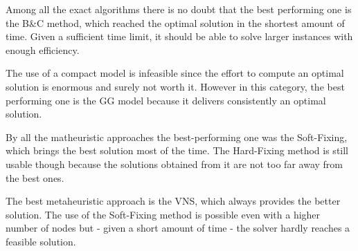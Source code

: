 Among all the exact algorithms there is no doubt that the best performing one is the B\&C method, which reached the optimal solution in the shortest amount of time. Given a sufficient time limit, it should be able to solve larger instances with enough efficiency.

The use of a compact model is infeasible since the effort to compute an optimal solution is enormous and surely not worth it. However in this category, the best performing one is the GG model because it delivers consistently an optimal solution.

By all the matheuristic approaches the best-performing one was the Soft-Fixing, which brings the best solution most of the time. The Hard-Fixing method is still usable though because the solutions obtained from it are not too far away from the best ones.

The best metaheuristic approach is the VNS, which always provides the better solution. The use of the Soft-Fixing method is possible even with a higher number of nodes but - given a short amount of time - the solver hardly reaches a feasible solution.